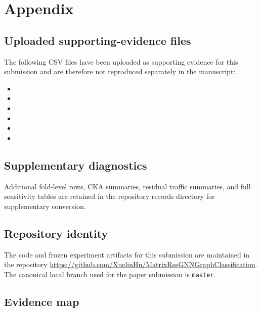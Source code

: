 \appendix

\section{Appendix}
\label{sec:appendix}

\subsection{Uploaded supporting-evidence files}

The following CSV files have been uploaded as supporting evidence for this submission and are therefore not reproduced separately in the manuscript:
\begin{itemize}
    \item {}
    \item {}
    \item {}
    \item {}
    \item {}
    \item {}
\end{itemize}

\subsection{Supplementary diagnostics}

Additional fold-level rows, CKA summaries, residual traffic summaries, and full sensitivity tables are retained in the repository records directory for supplementary conversion.

\subsection{Repository identity}

The code and frozen experiment artifacts for this submission are maintained in the repository \url{https://github.com/XuelinHu/MatrixResGNNGraphClassification}. The canonical local branch used for the paper submission is \texttt{master}.

\subsection{Evidence map}

